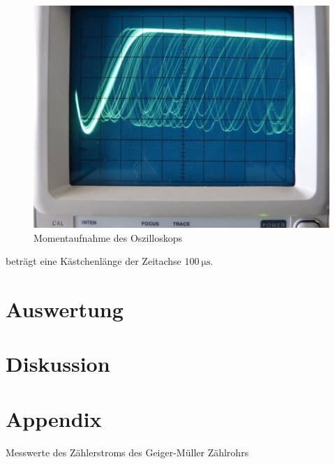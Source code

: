     \begin{figure}[H]
        \centering
        \includegraphics[width=\linewidth]{images/Oszilloskop.jpg}
        \caption{Momentaufnahme des Oszilloskops \cite{703}}
        \label{fig:5}
    \end{figure}

    \justifying beträgt eine Kästchenlänge der Zeitachse $\SI{100}{\micro\second}$. 




\section{Auswertung}

\section{Diskussion}

\newpage
\printbibliography

\section{Appendix}

    

    \begin{table}[H]
        \centering
        
        \caption{Messwerte des Zählerstroms des Geiger-Müller Zählrohrs}
        \label{tab:1}
    \end{table}

